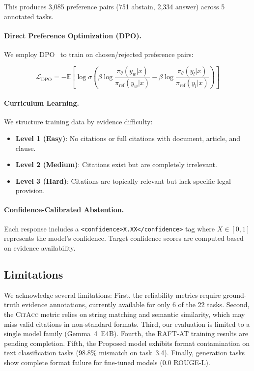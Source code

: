 \documentclass[11pt,a4paper]{article}
\newcommand{\model}{Gemma~4~E4B}
\newcommand{\citacc}{\textsc{CitAcc}}
\newcommand{\rougel}{ROUGE-L}
\begin{document}
This produces 3{,}085 preference pairs (751 abstain, 2{,}334 answer) across 5 annotated tasks.

\paragraph{Direct Preference Optimization (DPO).}
We employ DPO~\citep{rafailov2023dpo} to train on chosen/rejected preference pairs:

\begin{equation}
    \mathcal{L}_{\text{DPO}} = -\mathbb{E} \left[ \log \sigma \left( \beta \log \frac{\pi_\theta(y_w|x)}{\pi_{\text{ref}}(y_w|x)} - \beta \log \frac{\pi_\theta(y_l|x)}{\pi_{\text{ref}}(y_l|x)} \right) \right]
\end{equation}

\paragraph{Curriculum Learning.}
We structure training data by evidence difficulty:
\begin{itemize}[leftmargin=*, itemsep=2pt]
    \item \textbf{Level 1 (Easy)}: No citations or full citations with document, article, and clause.
    \item \textbf{Level 2 (Medium)}: Citations exist but are completely irrelevant.
    \item \textbf{Level 3 (Hard)}: Citations are topically relevant but lack specific legal provision.
\end{itemize}

\paragraph{Confidence-Calibrated Abstention.}
Each response includes a \texttt{<confidence>X.XX</confidence>} tag where $X \in [0, 1]$ represents the model's confidence.
Target confidence scores are computed based on evidence availability.

\subsection{Limitations}

We acknowledge several limitations:
First, the reliability metrics require ground-truth evidence annotations, currently available for only 6 of the 22 tasks.
Second, the \citacc{} metric relies on string matching and semantic similarity, which may miss valid citations in non-standard formats.
Third, our evaluation is limited to a single model family (\model{}).
Fourth, the RAFT-AT training results are pending completion.
Fifth, the Proposed model exhibits format contamination on text classification tasks (98.8\% mismatch on task~3.4).
Finally, generation tasks show complete format failure for fine-tuned models (0.0 \rougel{}).
\end{document}
